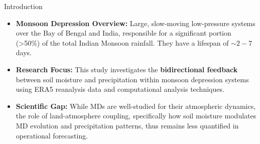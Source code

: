 \documentclass[aspectratio=169,t,xcolor=table]{beamer}
\begin{document}
\begin{frame}{Introduction}
	\footnotesize
	\begin{itemize}
		\item \textbf{Monsoon Depression Overview:}
		      Large, slow-moving low-pressure systems over the Bay of Bengal and India, responsible for a significant portion (\textgreater 50\%) of the total Indian Monsoon rainfall. They have a lifespan of $\sim 2-7$ days.
		      \vspace{0.3cm}
		\item \textbf{Research Focus:}
		      This study investigates the \textbf{bidirectional feedback} between soil moisture and precipitation within monsoon depression systems using ERA5 reanalysis data and computational analysis techniques.
		      \vspace{0.3cm}
		\item \textbf{Scientific Gap:}
		      While MDs are well-studied for their atmospheric dynamics, the role of land-atmosphere coupling, specifically how soil moisture modulates MD evolution and precipitation patterns, thus remains less quantified in operational forecasting.
	\end{itemize}
\end{frame}
\end{document}

